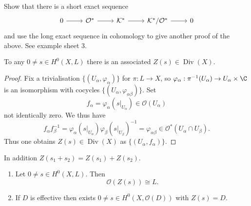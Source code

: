 \documentclass[a4paper]{article}
\DeclareMathOperator{\Div}{Div} %
\begin{document}
\begin{ex}
  Show that there is a short exact sequence
  \[
    \begin{tikzcd}
      0 \ar[r] & \mathcal O^* \ar[r] & \mathcal K^* \ar[r] & \mathcal K^*/\mathcal O^* \ar[r] & 0
    \end{tikzcd}
  \]
  and use the long exact sequence in cohomology to give another proof of the above. See example sheet 3.
\end{ex}

\begin{proposition}
  To any \(0 \neq s \in H^0(X, L)\) there is an associated \(Z(s) \in \Div(X)\).
\end{proposition}

\begin{proof}
  Fix a trivialisation \(\{(U_\alpha, \varphi_\alpha)\}\) for \(\pi: L \to X\), so \(\varphi_\alpha: \pi^{-1}(U_\alpha) \to U_\alpha \times \C\) is an isomorphism with cocycles \(\{(U_\alpha, \varphi_{\alpha\beta})\}\). Set
  \[
    f_\alpha = \varphi_\alpha(s|_{U_\alpha}) \in \mathcal O(U_\alpha)
  \]
  not identically zero. We thus have
  \[
    f_\alpha f_\beta^{-1}
    = \varphi_\alpha(s|_{U_\alpha}) \varphi_\beta(s|_{U_\beta})^{-1}
    = \varphi_{\alpha\beta} \in \mathcal O^*(U_\alpha \cap U_\beta).
  \]
  Thus one obtains \(Z(s) \in \Div(X)\) as \(\{(U_\alpha, f_\alpha)\}\).
\end{proof}
In addition \(Z(s_1 + s_2) = Z(s_1) + Z(s_2)\).

\begin{proposition}\leavevmode
  \begin{enumerate}
  \item Let \(0 \neq s \in H^0(X, L)\). Then
    \[
      \mathcal O(Z(s)) \cong L.
    \]
  \item If \(D\) is effective then exists \(0 \neq s \in H^0(X, \mathcal O(D))\) with \(Z(s) = D\).
  \end{enumerate}
\end{proposition}
\end{document}

